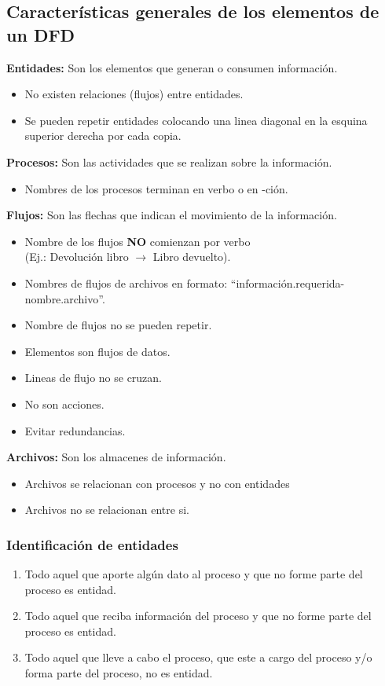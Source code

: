 \documentclass{templateNote}
\begin{document}
\subsection{Características generales de los elementos de un DFD}
\noindent\textbf{Entidades:} Son los elementos que generan o consumen información.
\begin{itemize}
    \item No existen relaciones (flujos) entre entidades.
    \item Se pueden repetir entidades colocando una linea diagonal en la esquina superior derecha por cada copia.
\end{itemize}
\textbf{Procesos:} Son las actividades que se realizan sobre la información.
\begin{itemize}
    \item Nombres de los procesos terminan en verbo o en -ción.
\end{itemize}
\textbf{Flujos:} Son las flechas que indican el movimiento de la información.
\begin{itemize}
    \item Nombre de los flujos \textbf{NO} comienzan por verbo \\(Ej.: Devolución libro $\rightarrow$ Libro devuelto).
    \item Nombres de flujos de archivos en formato: ``información.requerida-nombre.archivo''.
    \item Nombre de flujos no se pueden repetir.
    \item Elementos son flujos de datos.
    \item Lineas de flujo no se cruzan.
    \item No son acciones.
    \item Evitar redundancias.
\end{itemize}
\textbf{Archivos:} Son los almacenes de información.
\begin{itemize}
    \item Archivos se relacionan con procesos y no con entidades
    \item Archivos no se relacionan entre si.
\end{itemize}
\subsubsection{Identificación de entidades}
\begin{enumerate}
    \item Todo aquel que aporte algún dato al proceso y que no forme parte del proceso es entidad.
    \item Todo aquel que reciba información del proceso y que no forme parte del proceso es entidad.
    \item Todo aquel que lleve a cabo el proceso, que este a cargo del proceso y/o forma parte del proceso, no es entidad.
\end{enumerate}
\end{document}
